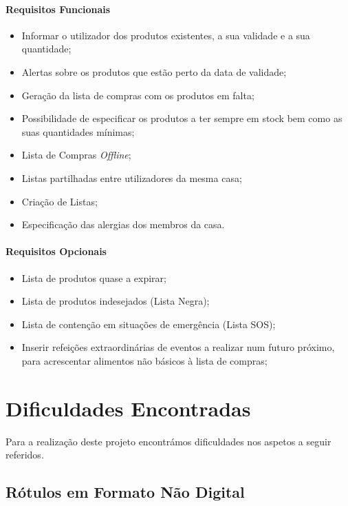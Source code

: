 \paragraph{Requisitos Funcionais}
\begin{itemize}
	\item Informar o utilizador dos produtos existentes, a sua validade e a sua quantidade;
	\item Alertas sobre os produtos que estão perto da data de validade;
	\item Geração da lista de compras com os produtos em falta;
	\item Possibilidade de especificar os produtos a ter sempre em stock bem como as suas quantidades mínimas;	
	\item Lista de Compras \textit{Offline};
	\item Listas partilhadas entre utilizadores da mesma casa;
	\item Criação de Listas;
	\item Especificação das alergias dos membros da casa.
\end{itemize}


\paragraph{Requisitos Opcionais}
\begin{itemize}
	\item Lista de produtos quase a expirar;
	\item Lista de produtos indesejados (Lista Negra);
	\item Lista de contenção em situações de emergência (Lista SOS);
	\item Inserir refeições extraordinárias de eventos a realizar num futuro próximo, para acrescentar alimentos não básicos à lista de compras;
\end{itemize}


%
%
\section{Dificuldades Encontradas} \label{sec23}

Para a realização deste projeto encontrámos dificuldades nos aspetos a seguir referidos.

\subsection{Rótulos em Formato Não Digital}

